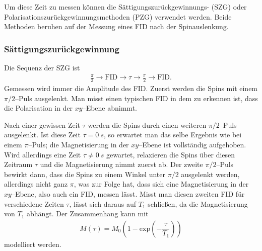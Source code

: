 \documentclass[10pt]{article}
\begin{document}
\begin{multicols}{2}
Um diese Zeit zu messen können die Sättigungszurückgewinnungs- (SZG) oder Polarisationszurückgewinnungsmethoden (PZG) verwendet werden. 
Beide Methoden beruhen auf der Messung eines FID nach der Spinauslenkung.

\subsubsection{Sättigungszurückgewinnung}
Die Sequenz der SZG ist
\begin{align} 
        \tfrac{\pi }{2}\rightarrow \text{FID}\rightarrow \tau \rightarrow \tfrac{\pi }{2}\rightarrow \text{FID}
.\end{align} 
Gemessen wird immer die Amplitude des FID.
Zuerst werden die Spins mit einem $\pi /2$--Puls ausgelenkt. 
Man misst einen typischen FID in dem zu erkennen ist, dass die Polarisation in der $xy$--Ebene abnimmt.

Nach einer gewissen Zeit $\tau $ werden die Spins durch einen weiteren $\pi /2$--Puls ausgelenkt. 
Ist diese Zeit $\tau =\SI{0}{s}$, so erwartet man das selbe Ergebnis wie bei einem $\pi $--Puls; die Magnetisierung in der $xy$--Ebene ist vollständig aufgehoben.
Wird allerdings eine Zeit $\tau \neq \SI{0}{s}$ gewartet, relaxieren die Spins über diesen Zeitraum $\tau $ und die Magnetisierung nimmt zuerst ab.
Der zweite $\pi /2$--Puls bewirkt dann, dass die Spins zu einem Winkel unter $\pi /2$ ausgelenkt werden, allerdings nicht ganz $\pi $, was zur Folge hat, dass sich eine Magnetisierung in der $xy$--Ebene, also auch ein FID, messen lässt.
Misst man diesen zweiten FID für verschiedene Zeiten $\tau $, lässt sich daraus auf $T_1$ schließen, da die Magnetisierung von $T_1$ abhängt.
Der Zusammenhang kann mit
\begin{align} 
        M\left(\tau \right)=M_0\left(1-\text{exp}\left(-\dfrac{\tau }{T_1}\right)\right)
\end{align} 
modelliert werden.


\end{multicols}
\end{document}
